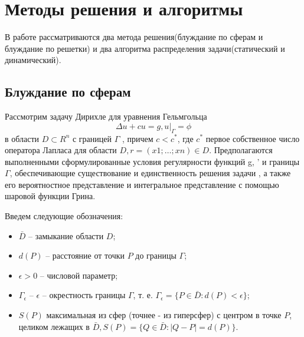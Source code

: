 \chapter{Методы решения и алгоритмы}
В работе рассматриваются два метода решения(блуждание по сферам и блуждание по решетки) и два алгоритма распределения задачи(статический и динамический).
\section{Блуждание по сферам}
Рассмотрим задачу Дирихле для уравнения Гельмгольца
\begin{equation} \Delta u + cu = g,	 u|_{\Gamma} = \phi \end{equation}
в области $D \subset R^{n}$ с границей $\Gamma$ , причем $c < c^{*}$, где $c^{*}$ первое собственное число оператора Лапласа для области $D, r = (x1;\dots; xn) \in D$. Предполагаются выполненными сформулированные условия регулярности функций g, ' и границы $\Gamma$, обеспечивающие существование и единственность решения задачи , а также его вероятностное представление и интегральное представление с помощью шаровой функции Грина.

Введем следующие обозначения:
\begin{itemize}
	\item $\bar{D}$  -- замыкание области $D$;
	\item $d(P)$ -- расстояние от точки $P$ до границы $\Gamma$;
	\item $\epsilon > 0 $ -- числовой параметр;
	\item $\Gamma_{\epsilon }$ -- $\epsilon$ -- окрестность границы $\Gamma$, т. е. $ \Gamma_{\epsilon }=\{ P \in \bar{D}:d(P) < \epsilon \} $;
	\item $S(P)$  максимальная из сфер (точнее - из гиперсфер) с центром в точке $P$, целиком лежащих в $\bar{D}, S(P) = \{Q \in \bar{D}: |Q - P| = d(P)\}$.
\end{itemize}


